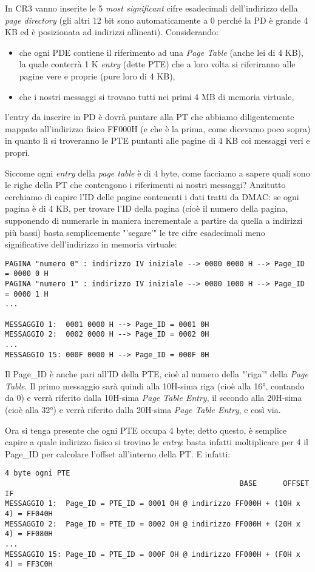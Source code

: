 In CR3 vanno inserite le 5 \textit{most significant} cifre esadecimali dell'indirizzo della \textit{page directory} (gli altri 12 bit sono automaticamente a 0 perché la PD è grande 4 KB ed è posizionata ad indirizzi allineati).
Considerando:
\begin{itemize}
\item che ogni PDE contiene il riferimento ad una \textit{Page Table} (anche lei di 4 KB), la quale conterrà 1 K \textit{entry} (dette PTE) che a loro volta si riferiranno alle pagine vere e proprie (pure loro di 4 KB),
\item che i nostri messaggi si trovano tutti nei primi 4 MB di memoria virtuale, 
\end{itemize}
l'entry da inserire in PD è dovrà puntare alla PT che abbiamo diligentemente mappato all'indirizzo fisico FF000H (e che è la prima, come dicevamo poco sopra) in quanto lì si troveranno le PTE puntanti alle pagine di 4 KB coi messaggi veri e propri. 

Siccome ogni \textit{entry} della \textit{page table} è di 4 byte, come facciamo a sapere quali sono le righe della PT che contengono i riferimenti ai nostri messaggi?
Anzitutto cerchiamo di capire l'ID delle pagine contenenti i dati tratti da DMAC: se ogni pagina è di 4 KB, per trovare l'ID della pagina (cioè il numero della pagina, supponendo di numerarle in maniera incrementale a partire da quella a indirizzi più bassi) basta semplicemente "'segare'" le tre cifre esadecimali meno significative dell'indirizzo in memoria virtuale:
\begin{verbatim}
PAGINA "numero 0" : indirizzo IV iniziale --> 0000 0000 H --> Page_ID = 0000 0 H
PAGINA "numero 1" : indirizzo IV iniziale --> 0000 1000 H --> Page_ID = 0000 1 H
...

MESSAGGIO 1:  0001 0000 H --> Page_ID = 0001 0H
MESSAGGIO 2:  0002 0000 H --> Page_ID = 0002 0H
...
MESSAGGIO 15: 000F 0000 H --> Page_ID = 000F 0H
\end{verbatim}
Il Page\_ID è anche pari all'ID della PTE, cioè al numero della "'riga'" della \textit{Page Table}. Il primo messaggio sarà quindi alla 10H-sima riga (cioè alla 16°, contando da 0) e verrà riferito dalla 10H-sima \textit{Page Table Entry}, il secondo alla 20H-sima (cioè alla 32°) e verrà riferito dalla 20H-sima \textit{Page Table Entry}, e così via. 

Ora si tenga presente che ogni PTE occupa 4 byte; detto questo, è semplice capire a quale indirizzo fisico si trovino le \textit{entry}: basta infatti moltiplicare per 4 il Page\_ID per calcolare l'offset all'interno della PT. E infatti:
\begin{verbatim}
4 byte ogni PTE
                                                      BASE      OFFSET      IF
MESSAGGIO 1:  Page_ID = PTE_ID = 0001 0H @ indirizzo FF000H + (10H x 4) = FF040H
MESSAGGIO 2:  Page_ID = PTE_ID = 0002 0H @ indirizzo FF000H + (20H x 4) = FF080H
...
MESSAGGIO 15: Page_ID = PTE_ID = 000F 0H @ indirizzo FF000H + (F0H x 4) = FF3C0H
\end{verbatim}

